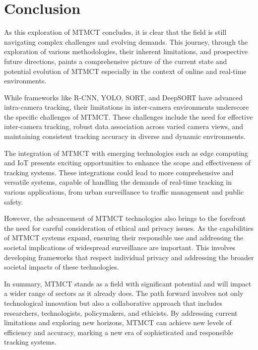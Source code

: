 \chapter{Conclusion}\label{chap:conclusion}
As this exploration of MTMCT concludes, it is clear that the field is still navigating complex challenges and evolving demands. This journey, through the exploration of various methodologies, their inherent limitations, and prospective future directions, paints a comprehensive picture of the current state and potential evolution of MTMCT especially in the context of online and real-time environments.

While frameworks like R-CNN, YOLO, SORT, and DeepSORT have advanced intra-camera tracking, their limitations in inter-camera environments underscore the specific challenges of MTMCT. These challenges include the need for effective inter-camera tracking, robust data association across varied camera views, and maintaining consistent tracking accuracy in diverse and dynamic environments.

The integration of MTMCT with emerging technologies such as edge computing and IoT presents exciting opportunities to enhance the scope and effectiveness of tracking systems. These integrations could lead to more comprehensive and versatile systems, capable of handling the demands of real-time tracking in various applications, from urban surveillance to traffic management and public safety.

However, the advancement of MTMCT technologies also brings to the forefront the need for careful consideration of ethical and privacy issues. As the capabilities of MTMCT systems expand, ensuring their responsible use and addressing the societal implications of widespread surveillance are important. This involves developing frameworks that respect individual privacy and addressing the broader societal impacts of these technologies.

In summary, MTMCT stands as a field with significant potential and will impact a wider range of sectors as it already does. The path forward involves not only technological innovation but also a collaborative approach that includes researchers, technologists, policymakers, and ethicists. By addressing current limitations and exploring new horizons, MTMCT can achieve new levels of efficiency and accuracy, marking a new era of sophisticated and responsible tracking systems.